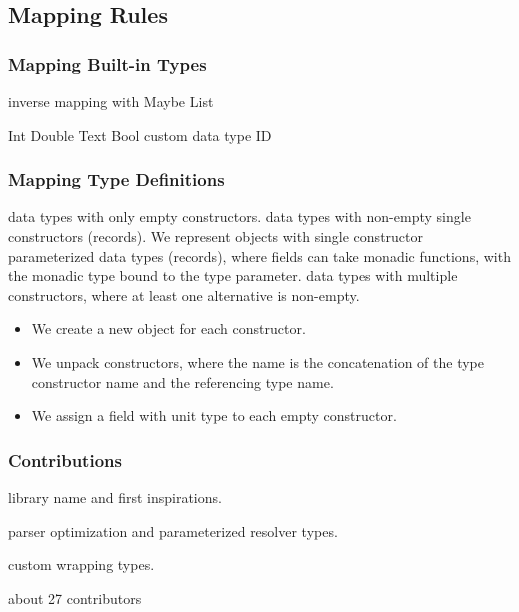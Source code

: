 \subsection{Mapping Rules}

\begin{frame}\frametitle{Mapping Built-in Types}
\begin{itemize}
  \begin{itemize}
     inverse mapping with Maybe
     List
  \end{itemize}
  \begin{itemize}
     Int
     Double
     Text
     Bool
     custom data type ID 
  \end{itemize}
\end{itemize}
\end{frame}

\begin{frame}\frametitle{Mapping Type Definitions}

\begin{itemize}
   data types with only empty constructors.
   data types with non-empty single constructors (records). 
   We represent objects with single constructor parameterized data types (records), where fields can take monadic functions, with the monadic type bound to the type parameter. 
   data types with multiple constructors, where at least one alternative is non-empty.
  \begin{itemize}
    \item We create a new object for each constructor.
    \item We unpack constructors, where the name is the concatenation of the type constructor name and the referencing type name. 
    \item We assign a field with unit type to each empty constructor.
  \end{itemize}
\end{itemize}

\end{frame}

\begin{frame}\frametitle{Contributions}

\begin{itemize} 
  
     library name and first inspirations.

     parser optimization and parameterized resolver types.
    
     custom wrapping types.

      about 27 contributors

\end{itemize}

\end{frame}
